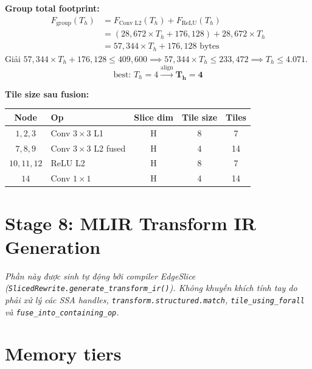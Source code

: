 \documentclass[11pt,a4paper]{article}
\begin{document}
\textbf{Group total footprint:}
\begin{align*}
F_{\text{group}}(T_h) &= F_{\text{Conv L2}}(T_h) + F_{\text{ReLU}}(T_h) \\
&= (28,672 \times T_h + 176,128) + 28,672 \times T_h \\
&= 57,344 \times T_h + 176,128\text{ bytes}
\end{align*}
Giải $57,344 \times T_h + 176,128 \le 409,600 \implies 57,344 \times T_h \le 233,472 \implies T_h \le 4.071$.
$$\text{best: } T_h = 4 \xrightarrow{\text{align}} \mathbf{T_h = 4}$$

\textbf{Tile size sau fusion:}
\begin{table}[H]
\centering
\begin{tabular}{clccc}
\toprule
\textbf{Node} & \textbf{Op} & \textbf{Slice dim} & \textbf{Tile size} & \textbf{Tiles} \\
\midrule
$1, 2, 3$   & Conv $3\times 3$ L1       & H & 8 & 7 \\
$7, 8, 9$   & Conv $3\times 3$ L2 fused & H & 4 & 14 \\
$10, 11, 12$ & ReLU L2                   & H & 8 & 7 \\
$14$         & Conv $1\times 1$          & H & 4 & 14 \\
\bottomrule
\end{tabular}
\end{table}

\newpage

\section{Stage 8: MLIR Transform IR Generation}

\textit{Phần này được sinh tự động bởi compiler EdgeSlice (\texttt{SlicedRewrite.generate\_transform\_ir()}). Không khuyến khích tính tay do phải xử lý các SSA handles, \texttt{transform.structured.match}, \texttt{tile\_using\_forall} và \texttt{fuse\_into\_containing\_op}.}

\section{Memory tiers}
\end{document}
